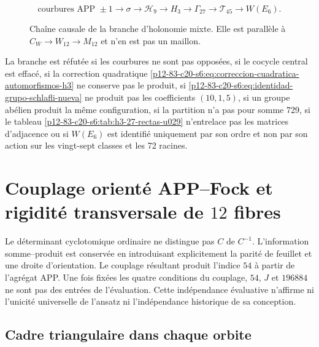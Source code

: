 \begin{figure}[htbp]
\centering
\[
 \text{courbures APP }\pm1
 \longrightarrow\sigma
 \longrightarrow\mathcal H_9
 \longrightarrow H_3
 \longrightarrow\Gamma_{27}
 \longrightarrow\mathcal T_{45}
 \longrightarrow W(E_6).
\]
\caption{Chaîne causale de la branche d’holonomie mixte. Elle est parallèle à
\(C_W\to W_{12}\to M_{12}\) et n’en est pas un maillon.}
\label{p12-83-c20-s6:fig:cadena-holonomia-e6-u029}
\end{figure}

\begin{criterion}
\label{p12-83-c20-s6:crit:refutacion-rama-e6-u029}
La branche est réfutée si les courbures ne sont pas opposées, si le cocycle
central est effacé, si la correction quadratique
\eqref{p12-83-c20-s6:eq:correccion-cuadratica-automorfismos-h3} ne conserve pas le produit,
si \eqref{p12-83-c20-s6:eq:identidad-grupo-schlafli-nueva} ne produit pas les coefficients
\((10,1,5)\), si un groupe abélien produit la même configuration, si la
partition n’a pas pour somme 729, si le tableau
\ref{p12-83-c20-s6:tab:h3-27-rectas-u029} n’entrelace pas les matrices d’adjacence ou si
\(W(E_6)\) est identifié uniquement par son ordre et non par son action sur les
vingt-sept classes et les 72 racines.
\end{criterion}


\section{Couplage orienté APP–Fock et rigidité transversale de \(12\) fibres}
\label{p12-83-c20-s7:chap:acoplamiento-app-fock}

Le déterminant cyclotomique ordinaire ne distingue pas \(C\) de \(C^{-1}\).
L'information somme--produit est conservée en introduisant explicitement la
parité de feuillet et une droite d'orientation. Le couplage résultant
produit l'indice \(54\) à partir de l'agrégat APP. Une fois fixées les quatre
conditions du couplage, \(54\), \(J\) et \(196884\) ne sont pas des entrées de
l'évaluation. Cette indépendance évaluative n'affirme ni l'unicité universelle
de l'ansatz ni l'indépendance historique de sa conception.

\subsection{Cadre triangulaire dans chaque orbite}


